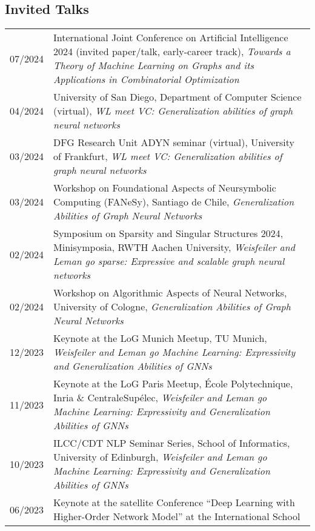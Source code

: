 \documentclass[11pt, a4paper, DIV=14, headings=small]{scrartcl}
\begin{document}
	\subsection*{Invited Talks}
	\begin{longtabu}{p{2.1cm}p{12.0cm}}
		 
		 07/2024 & International Joint Conference on Artificial Intelligence 2024 (invited paper/talk, early-career track), \emph{Towards a Theory of Machine Learning on Graphs and its Applications in Combinatorial Optimization}\\ 
		   04/2024 & University of San Diego, Department of Computer Science (virtual), \emph{WL meet VC: Generalization abilities of graph neural networks}\\ 
	     03/2024 & DFG Research Unit ADYN seminar (virtual), University of Frankfurt, \emph{WL meet VC: Generalization abilities of graph neural networks}\\
	     03/2024 & Workshop on Foundational Aspects of Neursymbolic Computing (FANeSy), Santiago de Chile, \emph{Generalization Abilities of Graph Neural Networks}\\ 
  	02/2024 & Symposium on Sparsity and Singular Structures 2024, Minisymposia, RWTH Aachen University, \emph{Weisfeiler and Leman go sparse: Expressive and scalable graph neural networks}\\   
	     02/2024 & Workshop on Algorithmic Aspects of Neural Networks, University of Cologne, \emph{Generalization Abilities of Graph Neural Networks}\\    
        12/2023 & Keynote at the LoG Munich Meetup, TU Munich, \emph{Weisfeiler and Leman go Machine Learning: Expressivity and Generalization Abilities of GNNs}\\             
		11/2023 & Keynote at the LoG Paris Meetup, École Polytechnique, Inria \& CentraleSupélec, \emph{Weisfeiler and Leman go Machine Learning: Expressivity and Generalization Abilities of GNNs}\\    
		10/2023 & ILCC/CDT NLP Seminar Series, School of Informatics, University of Edinburgh, \emph{Weisfeiler and Leman go Machine Learning: Expressivity and Generalization Abilities of GNNs}\\    
		06/2023 & Keynote at the satellite Conference ``Deep Learning with Higher-Order Network Model'' at the International School

\end{longtabu}
\end{document}
